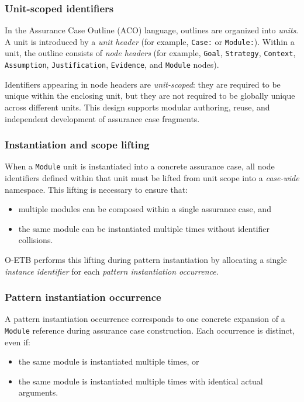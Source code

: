 \documentclass[12pt,twoside,a4paper]{article}
\begin{document}
\subsubsection{Unit-scoped identifiers}
In the Assurance Case Outline (ACO) language, outlines are organized into \emph{units}.
A unit is introduced by a \emph{unit header} (for example, \texttt{Case:} or \texttt{Module:}).
Within a unit, the outline consists of \emph{node headers} (for example,
\texttt{Goal}, \texttt{Strategy}, \texttt{Context}, \texttt{Assumption},
\texttt{Justification}, \texttt{Evidence}, and \texttt{Module} nodes).

Identifiers appearing in node headers are \emph{unit-scoped}:
they are required to be unique within the enclosing unit, but they are not required
to be globally unique across different units.
This design supports modular authoring, reuse, and independent development of
assurance case fragments.

\subsubsection{Instantiation and scope lifting}
When a \texttt{Module} unit is instantiated into a concrete assurance case,
all node identifiers defined within that unit must be lifted from unit scope into
a \emph{case-wide} namespace.
This lifting is necessary to ensure that:
\begin{itemize}
  \item multiple modules can be composed within a single assurance case, and
  \item the same module can be instantiated multiple times without identifier collisions.
\end{itemize}

O-ETB performs this lifting during pattern instantiation by allocating a single
\emph{instance identifier} for each \emph{pattern instantiation occurrence}.

\subsubsection{Pattern instantiation occurrence}
A pattern instantiation occurrence corresponds to one concrete expansion of a
\texttt{Module} reference during assurance case construction.
Each occurrence is distinct, even if:
\begin{itemize}
  \item the same module is instantiated multiple times, or
  \item the same module is instantiated multiple times with identical actual arguments.
\end{itemize}
\end{document}
